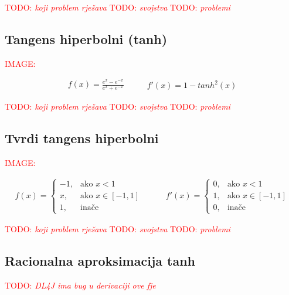 \documentclass[times, utf8, diplomski]{fer}
\def\TODO#1{\noindent\textcolor{red}{TODO: \textit{#1}}\newline}
\def\todo#1{\TODO{#1}}
\def\todoimg#1{\begin{center} \textcolor{red}{IMAGE: \textit{#1}} \end{center}}
\begin{document}
\todo{koji problem rješava}
\todo{svojstva}
\todo{problemi}

\subsection*{Tangens hiperbolni (tanh)}

\todoimg{}

\begin{equation}
\begin{split}
f(x) = \frac{e^x - e^{-x}}{e^x + e^{-x}}
\end{split}
\qquad
\begin{split}
f'(x) = 1 - tanh^2(x)
\end{split}
\end{equation}

\todo{koji problem rješava}
\todo{svojstva}
\todo{problemi}

\subsection*{Tvrdi tangens hiperbolni}

\todoimg{}

\begin{equation}
\begin{split}
f(x) =
\begin{cases}
-1,	 		& \text{ako } x < 1 \\
x,	 		& \text{ako } x \in [-1,1] \\
1,	& \text{inače}
\end{cases}
\end{split}
\qquad
\begin{split}
f'(x) =
\begin{cases}
0,	 		& \text{ako } x < 1 \\
1,	 		& \text{ako } x \in [-1,1] \\
0,	& \text{inače}
\end{cases}
\end{split}
\end{equation}

\todo{koji problem rješava}
\todo{svojstva}
\todo{problemi}

\subsection*{Racionalna aproksimacija tanh}

\todo{DL4J ima bug u derivaciji ove fje}
\end{document}
